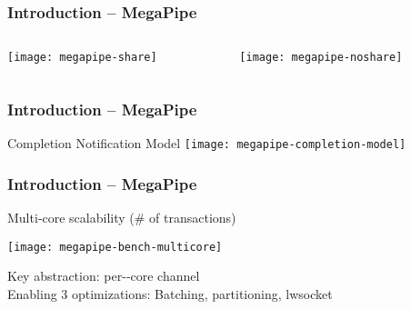 \begin{frame}[plain]
	\frametitle{Introduction -- MegaPipe}

	\begin{columns}
	
	\begin{column}{.5\textwidth}	

		\texttt{[image: megapipe-share]}

	\end{column}
	
	\begin{column}{.5\textwidth}
		\texttt{[image: megapipe-noshare]}
		
		
	\end{column}
	
\end{columns}
	
\end{frame}	


\begin{frame}[plain]
	\frametitle{Introduction -- MegaPipe}
	\Large Completion Notification	 Model
	\centering
	\texttt{[image: megapipe-completion-model]}			
	
\end{frame}	


\begin{frame}[plain]
	\frametitle{Introduction -- MegaPipe}
	\Large Multi‐core scalability (\#	of	 transactions)	

	\centering
	\texttt{[image: megapipe-bench-multicore]}	
			
	\normalsize
	Key	abstraction:	 per-­‐core	 channel	\\
 	Enabling 3 optimizations: 
 	Batching,	
 partitioning,	
 lwsocket	
  
 	

\end{frame}	



